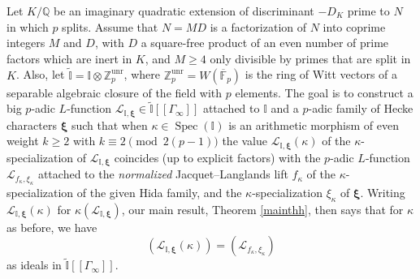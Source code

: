 \documentclass[a4paper,11pt]{amsart}
\numberwithin{equation}{section}
\theoremstyle{plain}
\theoremstyle{definition}
\theoremstyle{remark}
\newcommand{\Q}{\mathbb{Q}}
\newcommand{\Z}{\mathbb{Z}}
\newcommand{\F}{\mathbb{F}}
\newcommand{\I}{\mathbb{I}}
\DeclareMathOperator{\Spec}{Spec}
\newcommand{\unr}{\mathrm{unr}}
\begin{document}
Let $K/\Q$ be an imaginary quadratic extension of discriminant $-D_K$ prime to $N$ in which $p$ splits. Assume that $N=MD$ is a factorization of $N$ into coprime integers $M$ and $D$, with $D$ a square-free product of an even number of prime factors which are inert in $K$, and $M\geq 4$ only divisible by primes that are split in $K$.
Also, let $\widetilde{\I}=\I\otimes\Z_p^\unr$, where $\Z_p^\unr=W(\overline{\F}_p)$ is the ring of Witt vectors of a separable algebraic closure of the field with $p$ elements.  
The goal is to construct a big $p$-adic $L$-function $\mathscr{L}_{\I,\boldsymbol{\xi}}\in \widetilde{\I}[[{\Gamma_\infty}]]$ attached to $\I$ and a $p$-adic family of Hecke characters $\boldsymbol{\xi}$ such that when $\kappa\in\Spec(\I)$ is an arithmetic morphism of even weight $k\geq 2$ with $k\equiv 2\pmod{2(p-1)}$ the value $\mathscr{L}_{\I,\boldsymbol{\xi}}(\kappa)$ of the $\kappa$-specialization of $\mathscr{L}_{\I,\boldsymbol{\xi}}$ coincides (up to explicit factors) with the $p$-adic $L$-function $\mathscr{L}_{f_\kappa,\xi_\kappa}$ attached to the \emph{normalized} Jacquet--Langlands lift $f_\kappa$ of the $\kappa$-specialization of the given Hida family, and the $\kappa$-specialization $\xi_\kappa$ of $\boldsymbol{\xi}$. Writing $\mathscr{L}_{\I,\boldsymbol{\xi}}(\kappa)$ for $\kappa(\mathscr{L}_{\I,\boldsymbol{\xi}})$, our main result, Theorem \ref{mainthh}, then says that for $\kappa$ as before, we have 
 \[(\mathscr{L}_{\I,\boldsymbol{\xi}}(\kappa))=(\mathscr{L}_{f_\kappa,\xi_\kappa})\]
 as ideals in $\widetilde{\I}[[\Gamma_\infty]]$. 
\end{document}
